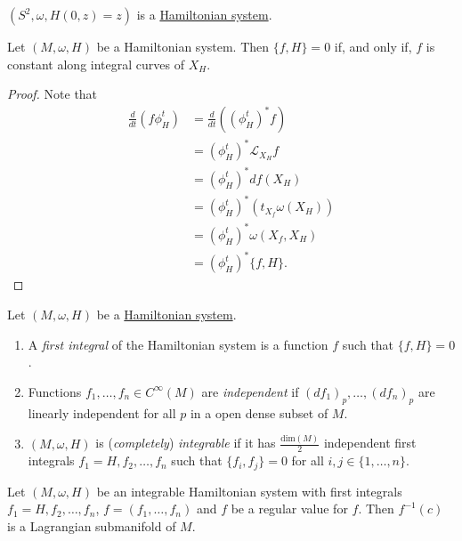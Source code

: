 \documentclass[misc]{subfiles}
\begin{document}
\begin{Exp}
    $(S^2,\omega,H(0,z)=z)$ is a \hyperref[Dfn: Hamiltonian system]{Hamiltonian system}.
\end{Exp}

\begin{Prp}
    Let $(M,\omega,H)$ be a Hamiltonian system. Then $\{f,H\}=0$ if, and only if, $f$ is constant along integral curves of $X_H$.

    \begin{proof}
    
        Note that
        \begin{align*}
            \frac{d}{dt}(f\phi_H^t) &= \frac{d}{dt}((\phi_H^t)^\ast f) \\
                                    &= (\phi_H^t)^\ast\mathcal{L}_{X_H}f \\
                                    &= (\phi_H^t)^\ast df(X_H) \\
                                    &= (\phi_H^t)^\ast (t_{X_f}\omega(X_H)) \\
                                    &= (\phi_H^t)^\ast \omega(X_f, X_H) \\
                                    &= (\phi_H^t)^\ast \{f,H\}.
        \end{align*}
    \end{proof}
\end{Prp}

\begin{Dfn}\label{Dfn: First integrals}
    Let $(M,\omega,H)$ be a \hyperref[Dfn: Hamiltonian system]{Hamiltonian system}.

    \begin{enumerate}[label=\DfnLbl]
    
        \item A \emph{first integral} of the Hamiltonian system is a function $f$ such that $\{f,H\}=0$.

        \item Functions $f_1,\dots,f_n\in C^\infty(M)$ are \emph{independent} if $(df_1)_p,\dots,(df_n)_p$ are linearly independent for all $p$ in a open dense subset of $M$.

        \item $(M,\omega,H)$ is (\emph{completely}) \emph{integrable} if it has $\frac{\text{dim}(M)}{2}$ independent first integrals $f_1=H,f_2,\dots,f_n$ such that $\{f_i,f_j\}=0$ for all $i,j\in\{1,\dots,n\}$.
    \end{enumerate}
\end{Dfn}

\begin{Nt}
    Let $(M,\omega,H)$ be an integrable Hamiltonian system with first integrals $f_1=H,f_2,\dots,f_n$, $f=(f_1,\dots,f_n)$ and $f$ be a regular value for $f$. Then $f^{-1}(c)$ is a Lagrangian submanifold of $M$.
\end{Nt}

\end{document}
